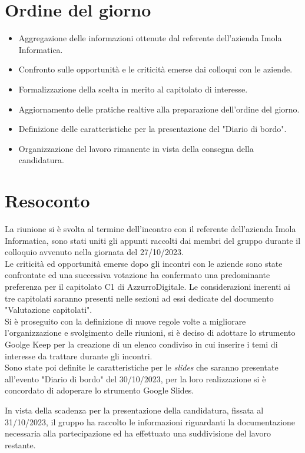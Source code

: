 \section{Ordine del giorno}
\begin{itemize}
    \item Aggregazione delle informazioni ottenute dal referente dell'azienda Imola Informatica.
    \item Confronto sulle opportunità e le criticità emerse dai colloqui con le aziende. 
	\item Formalizzazione della scelta in merito al capitolato di interesse.
	\item Aggiornamento delle pratiche realtive alla preparazione dell'ordine del giorno.
	\item Definizione delle caratteristiche per la presentazione del "Diario di bordo".
	\item Organizzazione del lavoro rimanente in vista della consegna della candidatura.
\end{itemize}

\section{Resoconto}
La riunione si è svolta al termine dell'incontro con il referente dell'azienda Imola Informatica, sono stati uniti gli appunti raccolti dai membri del gruppo durante il colloquio avvenuto nella giornata del 27/10/2023.  \\

\noindent
Le criticità ed opportunità emerse dopo gli incontri con le aziende sono state confrontate ed una successiva votazione ha confermato una predominante preferenza per il capitolato C1 di AzzurroDigitale.
Le considerazioni inerenti ai tre capitolati saranno presenti nelle sezioni ad essi dedicate del documento "Valutazione capitolati". \\

\noindent
Si è proseguito con la definizione di nuove regole volte a migliorare l'organizzazione e svolgimento delle riunioni, si è deciso di adottare lo strumento Goolge Keep per la creazione di un elenco condiviso in cui inserire i temi di interesse da trattare durante gli incontri. \\
Sono state poi definite le caratteristiche per le \textit{slides} che saranno presentate all'evento "Diario di bordo" del 30/10/2023, per la loro realizzazione si è concordato di adoperare lo strumento Google Slides.

\noindent 
In vista della scadenza per la presentazione della candidatura, fissata al 31/10/2023, il gruppo ha raccolto le informazioni riguardanti la documentazione necessaria alla partecipazione ed ha effettuato una suddivisione del lavoro restante.


